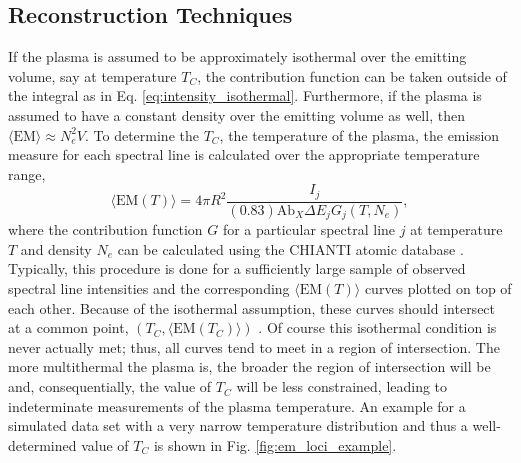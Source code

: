 \subsection{Reconstruction Techniques}
\label{subsec:reconstruction}
%
\par If the plasma is assumed to be approximately isothermal over the emitting volume, say at temperature $T_C$, the contribution function can be taken outside of the integral as in Eq. \ref{eq:intensity_isothermal}. Furthermore, if the plasma is assumed to have a constant density over the emitting volume as well, then $\langle\mathrm{EM}\rangle\approx N_e^2V$. To determine the $T_C$, the temperature of the plasma, the emission measure for each spectral line is calculated over the appropriate temperature range,
\begin{equation}
	\label{eq:em_loci}
	\langle\mathrm{EM}(T)\rangle=4\pi R^2\frac{I_j}{(0.83)\mathrm{Ab}_X\Delta E_jG_j(T,N_e)},
\end{equation}
where the contribution function $G$ for a particular spectral line $j$ at temperature $T$ and density $N_e$ can be calculated using the CHIANTI atomic database \citep{dere_chianti_1997,landi_chiantiatomic_2013}. Typically, this procedure is done for a sufficiently large sample of observed spectral line intensities and the corresponding $\langle\mathrm{EM}(T)\rangle$ curves plotted on top of each other. Because of the isothermal assumption, these curves should intersect at a common point, $(T_C,\langle\mathrm{EM}(T_C)\rangle)$ \citep{landi_chianti-atomic_2002}. Of course this isothermal condition is never actually met; thus, all curves tend to meet in a region of intersection. The more multithermal the plasma is, the broader the region of intersection will be and, consequentially, the value of $T_C$ will be less constrained, leading to indeterminate measurements of the plasma temperature. An example for a simulated data set with a very narrow temperature distribution and thus a well-determined value of $T_C$ is shown in Fig. \ref{fig:em_loci_example}. 
%

